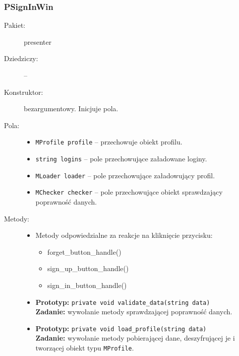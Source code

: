 \documentclass[a4paper]{article}
\newcommand{\prog}{\texttt}
\begin{document}
\subsubsection{PSignInWin}
\begin{description}
    \item[Pakiet:] presenter
    \item[Dziedziczy:] --
    \item[Konstruktor:] bezargumentowy. Inicjuje pola.
    \item[Pola:] \hfill
    \begin{itemize}
        \item \prog{MProfile profile} -- przechowuje obiekt profilu.
        \item \prog{string logins} -- pole przechowujące załadowane loginy.
        \item \prog{MLoader loader} -- pole przechowujące załadowujący profil.
        \item \prog{MChecker checker} -- pole przechowujące obiekt sprawdzający poprawność danych.
    \end{itemize}
    \item[Metody:] \hfill
    \begin{itemize}
        \item Metody odpowiedzialne za reakcje na kliknięcie przycisku:
        \begin{itemize}
            \item forget\_button\_handle()
            \item sign\_up\_button\_handle()
            \item sign\_in\_button\_handle()
        \end{itemize}
        \item \textbf{Prototyp:} \prog{private void validate\_data(string data)}\\\textbf{Zadanie:} wywołanie metody sprawdzającej poprawność danych.
        \item \textbf{Prototyp:} \prog{private void load\_profile(string data)}\\\textbf{Zadanie:} wywołanie metody pobierającej dane, deszyfrującej je i tworzącej obiekt typu \prog{MProfile}.
    \end{itemize}
\end{description}
\end{document}
